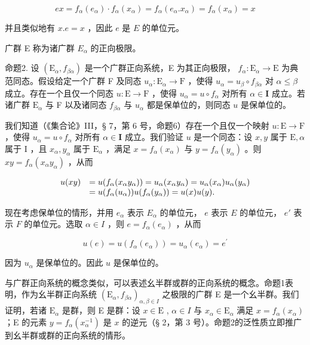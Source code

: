 \[
e x = f _ {\alpha} (e _ {\alpha}) \cdot f _ {\alpha} (x _ {\alpha}) = f _ {\alpha} (e _ {\alpha}. x _ {\alpha}) = f _ {\alpha} (x _ {\alpha}) = x
\]

并且类似地有 \(x.e = x\) ，因此 \(e\) 是 \(E\) 的单位元。

广群 E 称为诸广群 \(E_{\alpha}\) 的正向极限。

命题2. 设 \((\mathrm{E}_{\alpha}, f_{\beta \alpha})\) 是一个广群正向系统，E 为其正向极限， \(f_{\alpha} \colon \mathrm{E}_{\alpha} \to \mathrm{E}\) 为典范同态。假设给定一个广群 F 及同态 \(u_{\alpha} \colon \mathrm{E}_{\alpha} \to \mathrm{F}\) ，使得 \(u_{\alpha} = u_{\beta} \circ f_{\beta \alpha}\) 对 \(\alpha \leqslant \beta\) 成立。存在一个且仅一个同态 \(u \colon \mathrm{E} \to \mathrm{F}\) ，使得 \(u_{\alpha} = u \circ f_{\alpha}\) 对所有 \(\alpha \in \mathbf{I}\) 成立。若诸广群 \(\mathrm{E}_{\alpha}\) 与 F 以及诸同态 \(f_{\beta \alpha}\) 与 \(u_{\alpha}\) 都是保单位的，则同态 \(u\) 是保单位的。

我们知道（《集合论》III，§ 7，第 6 号，命题6）存在一个且仅一个映射 \(u: \mathrm{E} \to \mathrm{F}\) ，使得 \(u_{\alpha} = u \circ f_{\alpha}\) 对所有 \(\alpha \in \mathbf{I}\) 成立。我们验证 \(u\) 是一个同态：设 \(x, y\) 属于 \(\mathrm{E}, \alpha\) 属于 \(\mathrm{I}\) ，且 \(x_{\alpha}, y_{\alpha}\) 属于 \(\mathrm{E}_{\alpha}\) ，满足 \(x = f_{\alpha}(x_{\alpha})\) 与 \(y = f_{\alpha}(y_{\alpha})\) 。则 \(xy = f_{\alpha}(x_{\alpha}y_{\alpha})\) ，从而

\[
\begin{array}{r l} u (x y) & = u (f _ {\alpha} (x _ {\alpha} y _ {\alpha})) = u _ {\alpha} (x _ {\alpha} y _ {\alpha}) = u _ {\alpha} (x _ {\alpha}) u _ {\alpha} (y _ {\alpha}) \\ & = u (f _ {\alpha} (u _ {\alpha})) u (f _ {\alpha} (y _ {\alpha})) = u (x) u (y). \end{array}
\]

现在考虑保单位的情形，并用 \(e_{\alpha}\) 表示 \(E_{\alpha}\) 的单位元， \(e\) 表示 \(E\) 的单位元， \(e'\) 表示 \(F\) 的单位元。选取 \(\alpha \in I\) ，则 \(e = f_{\alpha}(e_{\alpha})\) ，从而

\[
u (e) = u \left(f _ {\alpha} \left(e _ {\alpha}\right)\right) = u _ {\alpha} \left(e _ {\alpha}\right) = e ^ {\prime}
\]

因为 \(u_{\alpha}\) 是保单位的。因此 \(u\) 是保单位的。

与广群正向系统的概念类似，可以表述幺半群或群的正向系统的概念。命题1表明，作为幺半群正向系统 \((\mathrm{E}_{\alpha}, f_{\beta \alpha})_{\alpha, \beta \in I}\) 之极限的广群 E 是一个幺半群。我们证明，若诸 \(\mathrm{E}_{\alpha}\) 是群，则 E 是群：设 \(x \in \mathrm{E}\) , \(\alpha \in I\) 与 \(x_{\alpha} \in \mathrm{E}_{\alpha}\) 满足 \(x = f_{\alpha}(x_{\alpha})\) ；E 的元素 \(y = f_{\alpha}(x_{\alpha}^{-1})\) 是 \(x\) 的逆元（§ 2，第 3 号）。命题2的泛性质立即推广到幺半群或群的正向系统的情形。

